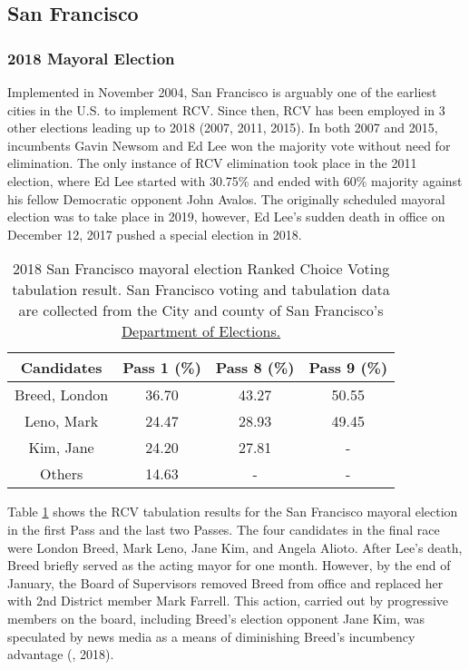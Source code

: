 \subsection{San Francisco}

\subsubsection{2018 Mayoral Election}

Implemented in November 2004, San Francisco is arguably one of the earliest cities in the U.S. to implement RCV. Since then, RCV has been employed in 3 other elections leading up to 2018 (2007, 2011, 2015). In both 2007 and 2015, incumbents Gavin Newsom and Ed Lee won the majority vote without need for elimination. The only instance of RCV elimination took place in the 2011 election, where Ed Lee started with 30.75\% and ended with 60\% majority against his fellow Democratic opponent John Avalos. The originally scheduled mayoral election was to take place in 2019, however, Ed Lee’s sudden death in office on December 12, 2017 pushed a special election in 2018. 

\begin{table}[h]
\centering
\begin{tabular}{|c|c|c|c|}
\hline
Candidates & Pass 1 (\%) & Pass 8 (\%) & Pass 9 (\%) \\ \hline
Breed, London & 36.70 & 43.27 & 50.55 \\ \hline
Leno, Mark & 24.47 & 28.93 & 49.45 \\ \hline
Kim, Jane & 24.20 & 27.81 & - \\ \hline
Others & 14.63 & - & - \\ \hline
\end{tabular}
\caption{2018 San Francisco mayoral election Ranked Choice Voting tabulation result. San Francisco voting and tabulation data are collected from the City and county of San Francisco's \href{https://www.sfelections.org/results/20180605/data/20180627/mayor/20180627_mayor.pdf}{Department of Elections.}}
\label{tab:7}
\end{table}

Table \ref{tab:7} shows the RCV tabulation results for the San Francisco mayoral election in the first Pass and the last two Passes. The four candidates in the final race were London Breed, Mark Leno, Jane Kim, and Angela Alioto. After Lee’s death, Breed briefly served as the acting mayor for one month. However, by the end of January, the Board of Supervisors removed Breed from office and replaced her with 2nd District member Mark Farrell. This action, carried out by progressive members on the board, including Breed’s election opponent Jane Kim, was speculated by news media as a means of diminishing Breed’s incumbency advantage (\cite{shafer2018}, 2018). 

